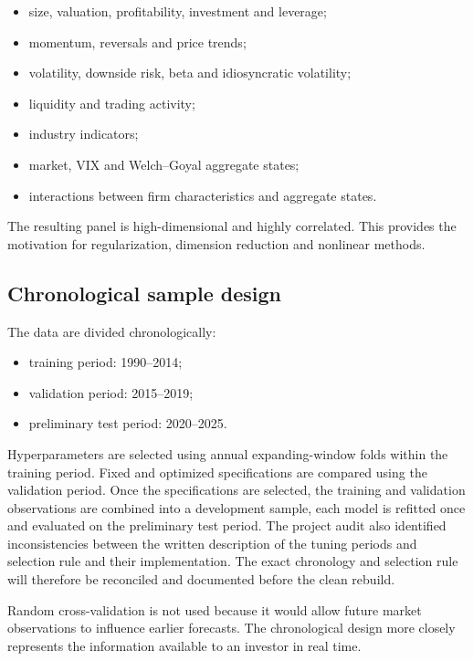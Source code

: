 \documentclass[11pt,a4paper]{article}
\begin{document}
\begin{itemize}
  \item size, valuation, profitability, investment and leverage;
  \item momentum, reversals and price trends;
  \item volatility, downside risk, beta and idiosyncratic volatility;
  \item liquidity and trading activity;
  \item industry indicators;
  \item market, VIX and Welch--Goyal aggregate states;
  \item interactions between firm characteristics and aggregate states.
\end{itemize}

The resulting panel is high-dimensional and highly correlated. This provides
the motivation for regularization, dimension reduction and nonlinear methods.

\subsection{Chronological sample design}

The data are divided chronologically:

\begin{itemize}
  \item training period: 1990--2014;
  \item validation period: 2015--2019;
  \item preliminary test period: 2020--2025.
\end{itemize}

Hyperparameters are selected using annual expanding-window folds within the
training period. Fixed and optimized specifications are compared using the
validation period. Once the specifications are selected, the training and
validation observations are combined into a development sample, each model is
refitted once and evaluated on the preliminary test period. The project audit
also identified inconsistencies between the written description of the tuning
periods and selection rule and their implementation. The exact chronology and
selection rule will therefore be reconciled and documented before the clean
rebuild.

Random cross-validation is not used because it would allow future market
observations to influence earlier forecasts. The chronological design more
closely represents the information available to an investor in real time.
\end{document}
